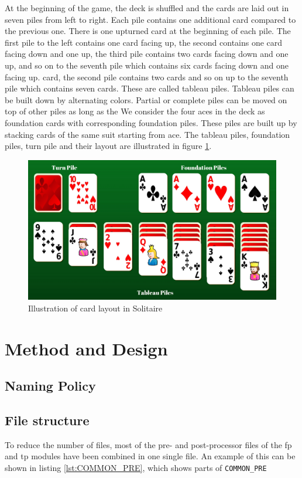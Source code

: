 \documentclass[runningheads,a4paper]{llncs}
\newcommand{\GPenSIM}{../GPenSIM}
\begin{document}
 At the beginning of the game, the deck is shuffled and the cards are laid out in seven piles from left to right. Each pile contains one additional card compared to the previous one. 
 There is one upturned card at the beginning of each pile. The first pile to the left contains one card facing up, the second contains one card facing down and one up, the third pile contains two cards facing down and one up, and so on to the seventh pile which contains six cards facing down and one facing up.
 card, the second pile contains two cards and so on up to the seventh pile which contains seven cards. These are called tableau piles. 
 Tableau piles can be built down by alternating colors. Partial or complete piles can be moved on top of other piles as long as the 
 We consider the four aces in the deck as foundation cards with corresponding foundation piles. These piles are built up by stacking cards of the same suit starting from ace.
The tableau piles, foundation piles, turn pile and their layout are illustrated in figure \ref{fig:illuatration_solitaire}.
\begin{figure}
	\includegraphics[trim=150 0 0 0, scale=0.3]{images/TableauPiles}
	\caption{Illustration of card layout in Solitaire}
	\label{fig:illuatration_solitaire}
\end{figure}


\section{Method and Design}
\label{sec:2_method_and_design}
\subsection{Naming Policy}
\subsection{File structure}
\label{sec:2_file_structure}
To reduce the number of files, most of the pre- and post-processor files of the \ac{fp} and \ac{tp} modules have been combined in one single file. An example of this can be shown in listing \ref{lst:COMMON_PRE}, which shows parts of \verb!COMMON_PRE!

\end{document}
